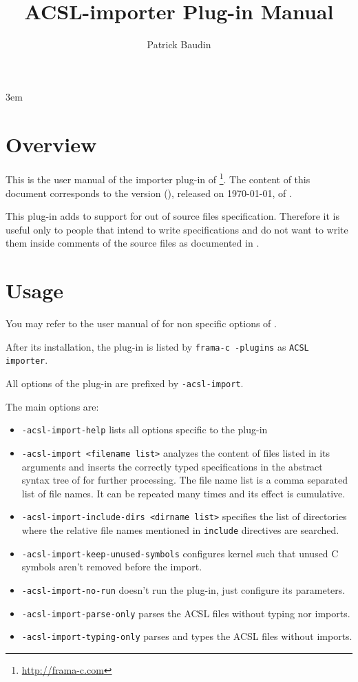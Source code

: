 \documentclass{frama-c-book}
\title{ACSL-importer Plug-in Manual}
\author{Patrick Baudin}
\newcommand{\FCVERSION}{(\unskip)}
\begin{document}
\sloppy
\emergencystretch 3em

\maketitle
\tableofcontents





\chapter{Overview}

This is the user manual of the \acsl\cite{acsl, acsl-implem} importer plug-in of
\FramaC\footnote{\url{http://frama-c.com}}. The content of this document
corresponds to the version \FCVERSION, released on \today, of \FramaC.

This plug-in adds to \FramaC support for out of \C source files
\acsl specification. Therefore it is useful only to people that
intend to write \acsl specifications and do not want to write them
inside comments of the \C source files as documented in \cite{acsl}.


\chapter{Usage}
You may refer to the user manual of \FramaC \cite{userman} for non
specific options of \FramaC.

After its installation, the plug-in is listed by \verb|frama-c -plugins|
as \verb|ACSL importer|.

All options of the plug-in are prefixed by \verb|-acsl-import|.

The main options are:
\begin{itemize}{}
\item \verb|-acsl-import-help| lists all options specific to the plug-in
\item \verb|-acsl-import <filename list>| analyzes the content of
  files listed in its arguments and inserts the correctly typed
  specifications in the abstract syntax tree of \FramaC for further processing.
  The file name list is a comma separated list of file names.
  It can be repeated many times and its effect is cumulative.
\item \verb|-acsl-import-include-dirs <dirname list>| specifies the list of
  directories where the relative file names mentioned in \verb|include|
  directives are searched.
\item \verb|-acsl-import-keep-unused-symbols| configures \FramaC kernel such that
  unused C symbols aren't removed before the import.
\item \verb|-acsl-import-no-run| doesn't run the plug-in, just configure its parameters.
\item \verb|-acsl-import-parse-only| parses the ACSL files without typing nor imports.
\item \verb|-acsl-import-typing-only| parses and types the ACSL files without imports.
\end{itemize}
\end{document}
